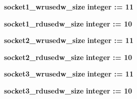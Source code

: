 \begin{DoxyCompactItemize}
\item 
{\bf socket1\+\_\+wrusedw\+\_\+size} {\bfseries {\bfseries \textcolor{comment}{integer}\textcolor{vhdlchar}{ }\textcolor{vhdlchar}{ }\textcolor{vhdlchar}{\+:}\textcolor{vhdlchar}{=}\textcolor{vhdlchar}{ }\textcolor{vhdlchar}{ } \textcolor{vhdldigit}{11} \textcolor{vhdlchar}{ }}}
\item 
{\bf socket1\+\_\+rdusedw\+\_\+size} {\bfseries {\bfseries \textcolor{comment}{integer}\textcolor{vhdlchar}{ }\textcolor{vhdlchar}{ }\textcolor{vhdlchar}{\+:}\textcolor{vhdlchar}{=}\textcolor{vhdlchar}{ }\textcolor{vhdlchar}{ } \textcolor{vhdldigit}{10} \textcolor{vhdlchar}{ }}}
\item 
{\bf socket2\+\_\+wrusedw\+\_\+size} {\bfseries {\bfseries \textcolor{comment}{integer}\textcolor{vhdlchar}{ }\textcolor{vhdlchar}{ }\textcolor{vhdlchar}{\+:}\textcolor{vhdlchar}{=}\textcolor{vhdlchar}{ }\textcolor{vhdlchar}{ } \textcolor{vhdldigit}{11} \textcolor{vhdlchar}{ }}}
\item 
{\bf socket2\+\_\+rdusedw\+\_\+size} {\bfseries {\bfseries \textcolor{comment}{integer}\textcolor{vhdlchar}{ }\textcolor{vhdlchar}{ }\textcolor{vhdlchar}{\+:}\textcolor{vhdlchar}{=}\textcolor{vhdlchar}{ }\textcolor{vhdlchar}{ } \textcolor{vhdldigit}{10} \textcolor{vhdlchar}{ }}}
\item 
{\bf socket3\+\_\+wrusedw\+\_\+size} {\bfseries {\bfseries \textcolor{comment}{integer}\textcolor{vhdlchar}{ }\textcolor{vhdlchar}{ }\textcolor{vhdlchar}{\+:}\textcolor{vhdlchar}{=}\textcolor{vhdlchar}{ }\textcolor{vhdlchar}{ } \textcolor{vhdldigit}{11} \textcolor{vhdlchar}{ }}}
\item 
{\bf socket3\+\_\+rdusedw\+\_\+size} {\bfseries {\bfseries \textcolor{comment}{integer}\textcolor{vhdlchar}{ }\textcolor{vhdlchar}{ }\textcolor{vhdlchar}{\+:}\textcolor{vhdlchar}{=}\textcolor{vhdlchar}{ }\textcolor{vhdlchar}{ } \textcolor{vhdldigit}{10} \textcolor{vhdlchar}{ }}}
\end{DoxyCompactItemize}
